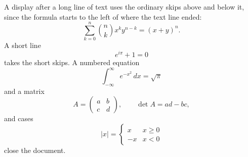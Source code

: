 \documentclass{article}
\begin{document}
A display after a long line of text uses the ordinary skips above and below it, since the formula starts to the left of where the text line ended:
\[ \sum_{k=0}^{n} \binom{n}{k} x^k y^{n-k} = (x+y)^n. \]
A short line
\[ e^{i\pi} + 1 = 0 \]
takes the short skips. A numbered equation
\begin{equation}
\int_{-\infty}^{\infty} e^{-x^2}\,dx = \sqrt{\pi}
\end{equation}
and a matrix
\[ A = \begin{pmatrix} a & b \\ c & d \end{pmatrix}, \qquad \det A = ad - bc, \]
and cases
\[ |x| = \begin{cases} x & x \ge 0 \\ -x & x < 0 \end{cases} \]
close the document.
\end{document}

